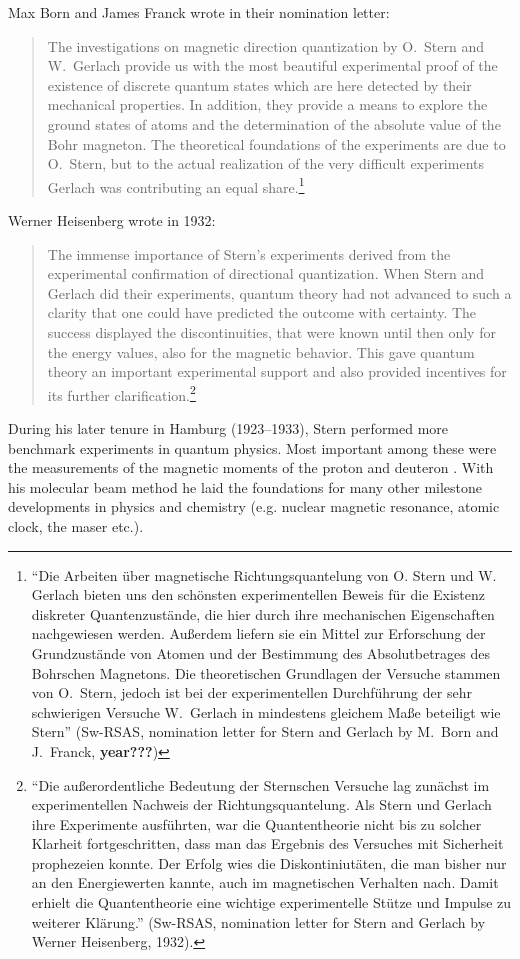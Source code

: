 \documentclass[12pt]{article}
\begin{document}
Max Born and James Franck wrote in their nomination letter: 
\begin{quote}
The investigations on magnetic direction quantization by O.~Stern and W.~Gerlach provide us with the most beautiful experimental proof of the existence of discrete quantum states which are here detected by their mechanical properties. In addition, they provide a means to explore the ground states of atoms and the determination of the absolute value of the Bohr magneton. The theoretical foundations of the experiments are due to O.~Stern, but to the actual realization of the very difficult experiments Gerlach was contributing an equal share.\footnote{``Die Arbeiten über magnetische Richtungsquantelung von O. Stern und W. Gerlach bieten uns den schönsten experimentellen Beweis für die Existenz diskreter Quantenzustände, die hier durch ihre mechanischen Eigenschaften nachgewiesen werden. Außerdem liefern sie ein Mittel zur Erforschung der Grundzustände von Atomen und der Bestimmung des Absolutbetrages des Bohrschen Magnetons. Die theoretischen Grundlagen der Versuche stammen von O.~Stern, jedoch ist bei der experimentellen Durchführung der sehr schwierigen Versuche W.~Gerlach in mindestens gleichem Maße beteiligt wie Stern'' (Sw-RSAS, nomination letter for Stern and Gerlach by M.~Born and J.~Franck, {\bf year???})}
\end{quote}  
Werner Heisenberg wrote in 1932: 
\begin{quote}
The immense importance of Stern's experiments derived from the experimental confirmation of directional quantization. When Stern and Gerlach did their experiments, quantum theory had not advanced to such a clarity that one could have predicted the outcome with certainty. The success displayed the discontinuities, that were known until then only for the energy values, also for the magnetic behavior. This gave quantum theory an important experimental support and also provided incentives for its further clarification.\footnote{``Die außerordentliche Bedeutung der Sternschen Versuche lag zunächst im experimentellen Nachweis der Richtungsquantelung. Als Stern und Gerlach ihre Experimente ausführten, war die Quantentheorie nicht bis zu solcher Klarheit fortgeschritten, dass man das Ergebnis des Versuches mit Sicherheit prophezeien konnte. Der Erfolg wies die Diskontiniutäten, die man bisher nur an den Energiewerten kannte, auch im magnetischen Verhalten nach. Damit erhielt die Quantentheorie eine wichtige experimentelle Stütze und Impulse zu weiterer Klärung.''  (Sw-RSAS, nomination letter for Stern and Gerlach by Werner Heisenberg, 1932).}
\end{quote}
During his later tenure in Hamburg (1923--1933), Stern performed more benchmark experiments in quantum physics. Most important among these were the measurements of the magnetic moments of the proton and deuteron \citep{FrischOEtal1933Ablenkunga,FrischOEtal1933Ablenkung,EstermannIEtal1933Moment,EstermannIEtal1933Ablenkung,EstermannIEtal1933Ablenkung2}.  With his molecular beam method he laid the foundations for many other milestone developments in physics and chemistry (e.g. nuclear magnetic resonance, atomic clock, the maser etc.). 
\end{document}

